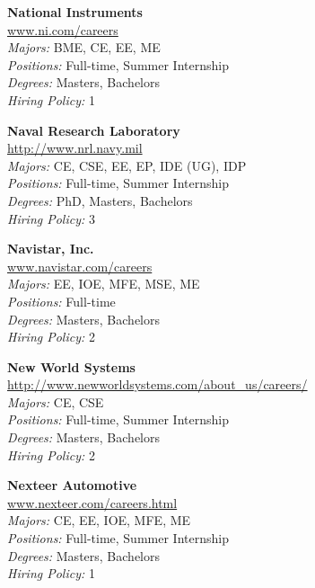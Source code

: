 \documentclass[twoside]{article}
\begin{document}
\begin{center}
\begin{multicols}{3}
\begin{minipage}{.9\columnwidth}{\Large\bf National Instruments }\\
	\url{www.ni.com/careers}\\
	\emph{Majors:} BME, CE, EE, ME\\
	\emph{Positions:} Full-time, Summer Internship\\
	\emph{Degrees:} Masters, Bachelors\\
	\emph{Hiring Policy:} 1\\
\end{minipage}
 
\begin{minipage}{.9\columnwidth}{\Large\bf Naval Research Laboratory }\\
	\url{http://www.nrl.navy.mil}\\
	\emph{Majors:} CE, CSE, EE, EP, IDE (UG), IDP\\
	\emph{Positions:} Full-time, Summer Internship\\
	\emph{Degrees:} PhD, Masters, Bachelors\\
	\emph{Hiring Policy:} 3\\
\end{minipage}
 
\begin{minipage}{.9\columnwidth}{\Large\bf Navistar, Inc. }\\
	\url{www.navistar.com/careers}\\
	\emph{Majors:} EE, IOE, MFE, MSE, ME\\
	\emph{Positions:} Full-time\\
	\emph{Degrees:} Masters, Bachelors\\
	\emph{Hiring Policy:} 2\\
\end{minipage}
 
\begin{minipage}{.9\columnwidth}{\Large\bf New World Systems }\\
	\url{http://www.newworldsystems.com/about_us/careers/}\\
	\emph{Majors:} CE, CSE\\
	\emph{Positions:} Full-time, Summer Internship\\
	\emph{Degrees:} Masters, Bachelors\\
	\emph{Hiring Policy:} 2\\
\end{minipage}
 
\begin{minipage}{.9\columnwidth}{\Large\bf Nexteer Automotive }\\
	\url{www.nexteer.com/careers.html}\\
	\emph{Majors:} CE, EE, IOE, MFE, ME\\
	\emph{Positions:} Full-time, Summer Internship\\
	\emph{Degrees:} Masters, Bachelors\\
	\emph{Hiring Policy:} 1\\
\end{minipage}
 

\end{multicols}
\end{center}
\end{document}
